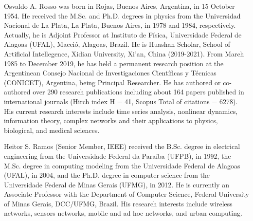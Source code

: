 \documentclass[journal]{IEEEtran}
\begin{document}
\begin{IEEEbiography} {Osvaldo A. Rosso} was born in Rojas, Buenos Aires, Argentina, in 15 October 1954. He received the M.Sc. and Ph.D. degrees in physics from the Universidad Nacional de La Plata, La Plata, Buenos Aires, in 1978 and 1984, respectively. Actually, he is Adjoint Professor at Instituto de Física, Universidade Federal de Alagoas (UFAL), Maceió, Alagoas, Brazil. He is Huashan Scholar, School of Artificial Intellegence, Xidian University, Xi’an, China (2019-2021). From March 1985 to December 2019, he has held a permanent research position at the Argentinean Consejo Nacional de Investigaciones Científicas y Técnicas (CONICET), Argentina, being Principal Researcher. He has authored or co-authored over 290 research publications including about 164 papers published in international journals (Hirch index H = 41, Scopus Total of citations = 6278). His current research interests include time series analysis, nonlinear dynamics, information theory, complex networks and their applications to physics, biological, and medical sciences.
\end{IEEEbiography}

\begin{IEEEbiography} {Heitor S. Ramos} (Senior Member, IEEE) received the B.Sc. degree in electrical engineering from the Universidade Federal da Paraíba (UFPB), in 1992, the M.Sc. degree in computing modeling from the Universidade Federal de Alagoas (UFAL), in 2004, and the Ph.D. degree in computer science from the Universidade Federal de Minas Gerais (UFMG), in 2012. He is currently an Associate Professor with the Department of Computer Science, Federal University of Minas Gerais, DCC/UFMG, Brazil. His research interests include wireless networks, sensors networks, mobile and ad hoc networks, and urban computing.
\end{IEEEbiography}
\end{document}
